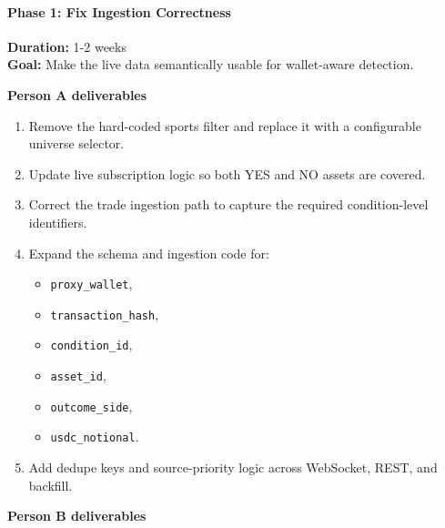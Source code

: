 \documentclass[
]{article}
\providecommand{\tightlist}{%
  \setlength{\itemsep}{0pt}\setlength{\parskip}{0pt}}
\begin{document}
\paragraph{Phase 1: Fix Ingestion
Correctness}\label{phase-1-fix-ingestion-correctness}

\textbf{Duration:} 1-2 weeks\\
\textbf{Goal:} Make the live data semantically usable for wallet-aware
detection.

\textbf{Person A deliverables}

\begin{enumerate}
\def\labelenumi{\arabic{enumi}.}
\tightlist
\item
  Remove the hard-coded sports filter and replace it with a configurable
  universe selector.
\item
  Update live subscription logic so both YES and NO assets are covered.
\item
  Correct the trade ingestion path to capture the required
  condition-level identifiers.
\item
  Expand the schema and ingestion code for:

  \begin{itemize}
  \tightlist
  \item
    \texttt{proxy\_wallet},
  \item
    \texttt{transaction\_hash},
  \item
    \texttt{condition\_id},
  \item
    \texttt{asset\_id},
  \item
    \texttt{outcome\_side},
  \item
    \texttt{usdc\_notional}.
  \end{itemize}
\item
  Add dedupe keys and source-priority logic across WebSocket, REST, and
  backfill.
\end{enumerate}

\textbf{Person B deliverables}
\end{document}
